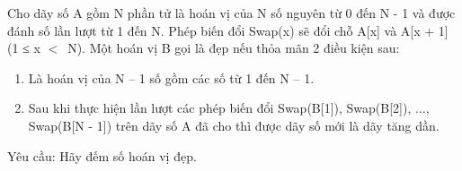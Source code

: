 Cho dãy số A gồm N phần tử là hoán vị của N số nguyên từ 0 đến N - 1 và được đánh số lần lượt từ 1 đến N. Phép biến đổi Swap(x) sẽ đổi chỗ A[x] và A[x + 1] (1 ≤ x $<$ N). Một hoán vị B gọi là đẹp nếu thỏa mãn 2 điều kiện sau:  
\begin{enumerate}
	\item     Là hoán vị của N – 1 số gồm các số từ 1 đến N – 1.   
	\item     Sau khi thực hiện lần lượt các phép biến đổi Swap(B[1]), Swap(B[2]), ..., Swap(B[N - 1]) trên dãy số A đã cho thì được dãy số mới là dãy tăng dần.   
\end{enumerate}

   Yêu cầu: Hãy đếm số hoán vị đẹp.
